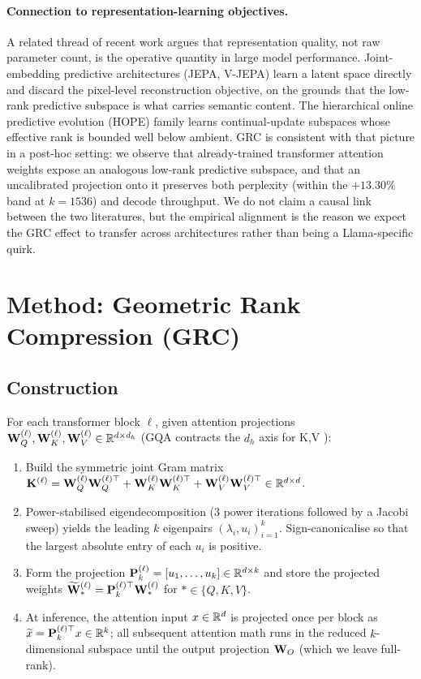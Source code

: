 \documentclass[11pt]{article}
\begin{document}
\paragraph{Connection to representation-learning objectives.}
A related thread of recent work argues that representation quality, not
raw parameter count, is the operative quantity in large model performance.
Joint-embedding predictive architectures (JEPA, V-JEPA)
\cite{assran2023ijepa,bardes2024vjepa} learn a latent space directly and
discard the pixel-level reconstruction objective, on the grounds that the
low-rank predictive subspace is what carries semantic content. The
hierarchical online predictive evolution (HOPE) family
\cite{behrouz2025hope} learns continual-update subspaces whose effective
rank is bounded well below ambient. GRC is consistent with that picture in
a post-hoc setting: we observe that already-trained transformer attention
weights expose an analogous low-rank predictive subspace, and that an
uncalibrated projection onto it preserves both perplexity (within the
$+13.30\%$ band at $k{=}1536$) and decode throughput. We do not claim a
causal link between the two literatures, but the empirical alignment is the
reason we expect the GRC effect to transfer across architectures rather
than being a Llama-specific quirk.

\section{Method: Geometric Rank Compression (GRC)}
\label{sec:method}

\subsection{Construction}
For each transformer block $\ell$, given attention projections
$\mathbf{W}_Q^{(\ell)},\mathbf{W}_K^{(\ell)},\mathbf{W}_V^{(\ell)}\in\mathbb{R}^{d\times d_h}$
(GQA contracts the $d_h$ axis for K,V \cite{ainslie2023gqa}):
\begin{enumerate}
\item Build the symmetric joint Gram matrix
$\mathbf{K}^{(\ell)} = \mathbf{W}_Q^{(\ell)}\mathbf{W}_Q^{(\ell)\top}+\mathbf{W}_K^{(\ell)}\mathbf{W}_K^{(\ell)\top}+\mathbf{W}_V^{(\ell)}\mathbf{W}_V^{(\ell)\top}\in\mathbb{R}^{d\times d}$.
\item Power-stabilised eigendecomposition (3 power iterations followed by a
Jacobi sweep) yields the leading $k$ eigenpairs
$(\lambda_i,u_i)_{i=1}^k$.  Sign-canonicalise so that the largest
absolute entry of each $u_i$ is positive.
\item Form the projection $\mathbf{P}_k^{(\ell)}=[u_1,\dots,u_k]
\in\mathbb{R}^{d\times k}$ and store the projected weights
$\widetilde{\mathbf{W}}_*^{(\ell)} = \mathbf{P}_k^{(\ell)\top}\mathbf{W}_*^{(\ell)}$ for
$*\in\{Q,K,V\}$.
\item At inference, the attention input $x\in\mathbb{R}^d$ is projected once
per block as $\widetilde{x} = \mathbf{P}_k^{(\ell)\top}x\in\mathbb{R}^k$;
all subsequent attention math runs in the reduced $k$-dimensional subspace
until the output projection $\mathbf{W}_O$ (which we leave full-rank).
\end{enumerate}
\end{document}
